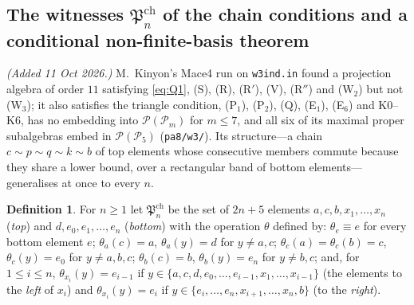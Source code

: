 \documentclass[11pt]{amsart}
\theoremstyle{definition}
\newtheorem{definition}[theorem]{Definition}
\renewcommand{\P}{\mathcal{P}}
\begin{document}
\subsection{The witnesses $\mathfrak P_n^{\mathrm{ch}}$ of the chain conditions and a conditional non-finite-basis theorem}\label{subsec:chainwit}

\emph{(Added 11 Oct 2026.)} M.~Kinyon's Mace4 run on \texttt{w3ind.in} found a projection algebra of order $11$ satisfying \eqref{eq:Q1}, (S), (R), (R$'$), (V), (R$''$) and (W$_2$) but not (W$_3$); it also satisfies the triangle condition, (P$_1$), (P$_2$), (Q), (E$_1$), (E$_6$) and K0--K6, has no embedding into $\P(\P_m)$ for $m\le7$, and all six of its maximal proper subalgebras embed in $\P(\P_5)$ (\texttt{pa8/w3/}). Its structure---a chain $c\sim p\sim q\sim k\sim b$ of top elements whose consecutive members commute because they share a lower bound, over a rectangular band of bottom elements---generalises at once to every $n$.

\begin{definition}\label{def:chainwit}
For $n\ge1$ let $\mathfrak P^{\mathrm{ch}}_n$ be the set of $2n+5$ elements $a,c,b,x_1,\dots,x_n$ (\emph{top}) and $d,e_0,e_1,\dots,e_n$ (\emph{bottom}) with the operation $\theta$ defined by: $\theta_e\equiv e$ for every bottom element $e$; $\theta_a(c)=a$, $\theta_a(y)=d$ for $y\ne a,c$; $\theta_c(a)=\theta_c(b)=c$, $\theta_c(y)=e_0$ for $y\ne a,b,c$; $\theta_b(c)=b$, $\theta_b(y)=e_n$ for $y\ne b,c$; and, for $1\le i\le n$, $\theta_{x_i}(y)=e_{i-1}$ if $y\in\{a,c,d,e_0,\dots,e_{i-1},x_1,\dots,x_{i-1}\}$ (the elements to the \emph{left} of $x_i$) and $\theta_{x_i}(y)=e_i$ if $y\in\{e_i,\dots,e_n,x_{i+1},\dots,x_n,b\}$ (to the \emph{right}).
\end{definition}
\end{document}
